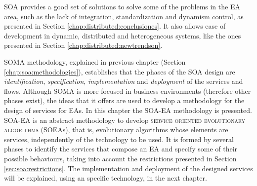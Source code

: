 \label{chap:soaea}
\minitoc\mtcskip
\vfill
\lettrine{S}{OA} provides a good set of solutions to solve some of the
problems in the EA area, such as the lack of integration,
standardization and dynamism control, as presented in Section \ref{chap:distributed:conclusiones}. It also allows ease of
development in dynamic, distributed and heterogeneous systems, like the ones presented in Section \ref{chap:distributed:newtrendson}. %


SOMA methodology, explained in previous chapter (Section \ref{chap:soa:methodologies}), establishes that the phases of the SOA design are {\em identification}, {\em specification}, {\em implementation} and {\em deployment} of the services and flows. Although SOMA is more focused in business environments (therefore other phases exist), the ideas that it offers are used to develop a methodology for the design of services for EAs. In this chapter the SOA-EA methodology is presented. SOA-EA is an abstract methodology to develop \textsc{service oriented evolutionary algorithms} (SOEAs), that is, evolutionary algorithms whose elements are services, independently of the technology to be used. It is formed by several phases to identify the services that compose an EA and specify some of their possible behaviours, taking into account the restrictions presented in Section \ref{sec:soa:restrictions}. The implementation and deployment of the designed services will be explained, using an specific technology, in the next chapter.


